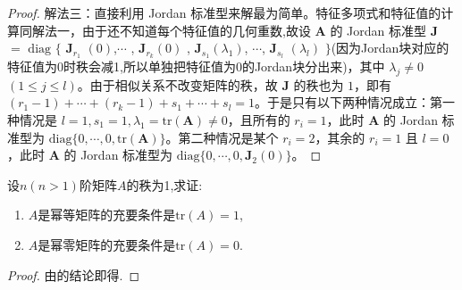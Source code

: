 \documentclass[../../main.tex]{subfiles}%
\begin{document}
\begin{proof}
{\color{blue}解法三：}直接利用 Jordan 标准型来解最为简单。特征多项式和特征值的计算同解法一，由于还不知道每个特征值的几何重数,故设 \(\boldsymbol{A}\) 的 Jordan 标准型 $\boldsymbol{J}$  $=$ $\mathrm{diag}$ $\{$ $\boldsymbol{J}_{r_1}$ $(0)$,$ \cdots$ , $\boldsymbol{J}_{r_k}(0)$ , $\boldsymbol{J}_{s_1}(\lambda_1)$, $\cdots$, $\boldsymbol{J}_{s_l}$ $(\lambda_l)$ $\}$(因为Jordan块对应的特征值为0时秩会减1,所以单独把特征值为0的Jordan块分出来)，其中 \(\lambda_j \neq 0\) \((1 \leqslant  j \leqslant  l)\)。由于相似关系不改变矩阵的秩，故 \(\boldsymbol{J}\) 的秩也为 \(1\)，即有 \((r_1 - 1) + \cdots + (r_k - 1) + s_1 + \cdots + s_l = 1\)。于是只有以下两种情况成立：第一种情况是 \(l = 1, s_1 = 1, \lambda_1 = \mathrm{tr}(\boldsymbol{A}) \neq 0\)，且所有的 \(r_i = 1\)，此时 \(\boldsymbol{A}\) 的 Jordan 标准型为 \(\mathrm{diag}\{0, \cdots, 0, \mathrm{tr}(\boldsymbol{A})\}\)。第二种情况是某个 \(r_i = 2\)，其余的 \(r_i = 1\) 且 \(l = 0\)，此时 \(\boldsymbol{A}\) 的 Jordan 标准型为 \(\mathrm{diag}\{0, \cdots, 0, \boldsymbol{J}_2(0)\}\)。
\end{proof}

\begin{proposition}\label{proposition:幂等阵和幂零阵关于迹的充要条件}
设$n(n>1)$阶矩阵$A$的秩为1,求证:
\begin{enumerate}[(1)]
\item $A$是幂等矩阵的充要条件是$\mathrm{tr}\left( A \right) =1$,


\item $A$是幂零矩阵的充要条件是$\mathrm{tr}\left( A \right) =0$.
\end{enumerate}
\end{proposition}
\begin{proof}
由的结论即得.
\end{proof}
\end{document}
